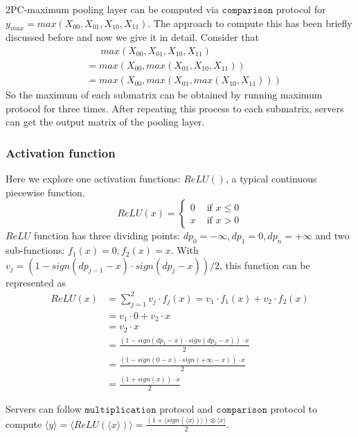 \documentclass[letterpaper]{article} %
\begin{document}
    2PC-maximum pooling layer can be computed via $\mathtt{comparison}$ protocol for
    $y_{max}=max(X_{00}, X_{01}, X_{10}, X_{11})$.
    The approach to compute this has been briefly discussed before and now we give it in detail.
    Consider that
    \begin{align*}
        &\enspace \enspace \enspace  max(X_{00}, X_{01}, X_{10}, X_{11}) \\
        &= max(X_{00},max(X_{01}, X_{10}, X_{11})) \\
      &= max(X_{00},max(X_{01},max(X_{10}, X_{11})))
    \end{align*}
    So the maximum of each submatrix can be obtained by running
    maximum protocol for three times.
    After repeating this process to each submatrix, servers can get the output matrix of the pooling layer.


    \subsubsection{Activation function}
    Here we explore one  activation functions: $ReLU()$, a typical continuous piecewise function.
    $$ReLU(x)=\begin{cases}
        0 & \text{ if } x \leqslant 0  \\
        x & \text{ if } x > 0
        \end{cases}$$
    $ReLU$ function has three dividing points: $dp_{0}= -\infty ,dp_{1}= 0, dp_{n}=+\infty$ and two sub-functions:
    $f_{1}(x)= 0 ,f_{2}(x)= x$.
    With $v_{j} = (1-sign(dp_{j-1}-x)\cdot sign(dp_{j}-x))/2$, this function can be represented as
    \begin{align*}
        ReLU(x)&=\sum_{j=1}^{2}v_{j}\cdot f_{j}(x)=v_{1}\cdot f_{1}(x)+v_{2}\cdot f_{2}(x)\\
        &=v_{1}\cdot 0 +v_{2}\cdot x\\
        &=v_{2}\cdot x\\
        &=\frac{(1-sign(dp_{1}-x)\cdot sign(dp_{2}-x))\cdot x}{2} \\
        &=\frac{(1-sign(0-x)\cdot sign(+\infty -x))\cdot x}{2} \\
        &=\frac{(1+sign(x))\cdot x}{2}
    \end{align*}

    Servers can follow $\mathtt{multiplication}$ protocol and $\mathtt{comparison}$ protocol to compute
    $\langle y\rangle=\langle ReLU(\langle x\rangle)\rangle=\frac{(1+\langle sign(\langle x\rangle)\rangle)\otimes \langle x\rangle}{2}$.
\end{document}
